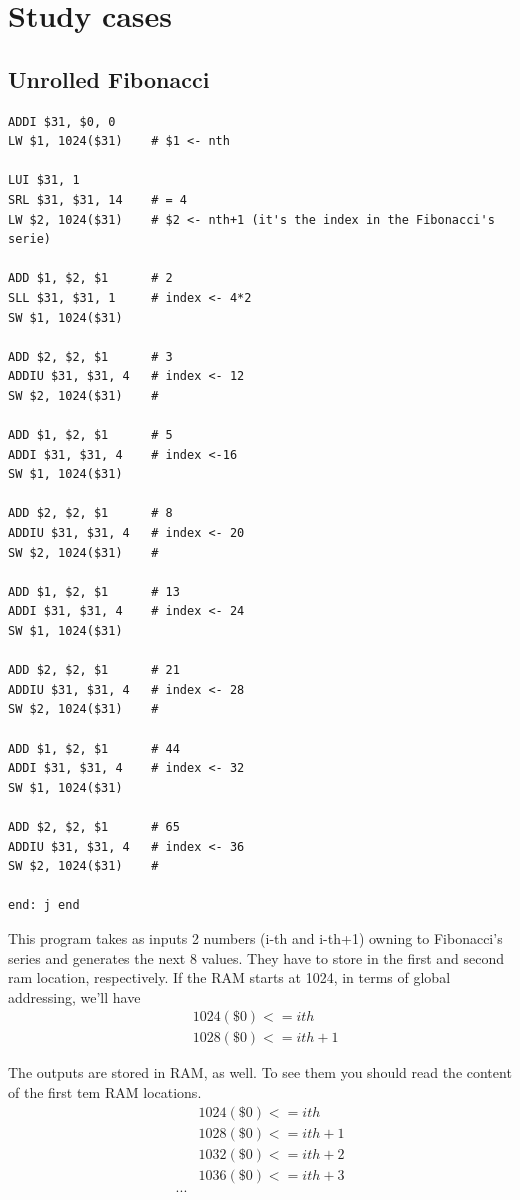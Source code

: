 \documentclass[a4paper,twoside]{article}
\theoremstyle{definition}
\theoremstyle{remark}
\begin{document}
\newpage


\section{Study cases}

\subsection{Unrolled Fibonacci}

\begin{lstlisting}
ADDI $31, $0, 0
LW $1, 1024($31)	# $1 <- nth

LUI $31, 1
SRL $31, $31, 14	# = 4
LW $2, 1024($31)	# $2 <- nth+1 (it's the index in the Fibonacci's serie)

ADD $1, $2, $1		# 2
SLL $31, $31, 1		# index <- 4*2
SW $1, 1024($31)

ADD $2, $2, $1		# 3
ADDIU $31, $31, 4	# index <- 12
SW $2, 1024($31)	# 

ADD $1, $2, $1		# 5
ADDI $31, $31, 4	# index <-16
SW $1, 1024($31)

ADD $2, $2, $1		# 8
ADDIU $31, $31, 4	# index <- 20
SW $2, 1024($31)	# 

ADD $1, $2, $1		# 13
ADDI $31, $31, 4	# index <- 24
SW $1, 1024($31)

ADD $2, $2, $1		# 21
ADDIU $31, $31, 4	# index <- 28
SW $2, 1024($31)	# 

ADD $1, $2, $1		# 44
ADDI $31, $31, 4	# index <- 32
SW $1, 1024($31)

ADD $2, $2, $1		# 65
ADDIU $31, $31, 4	# index <- 36
SW $2, 1024($31)	# 

end: j end
\end{lstlisting}

This program takes as inputs 2 numbers (i-th and i-th+1) owning to Fibonacci's 
series and generates the next 8 values. They have to store in the first and 
second ram location, respectively.
If the RAM starts at 1024, in terms of global addressing, we'll have
\begin{align*}
&1024(\$0) <= ith\\
&1028(\$0) <= ith+1
\end{align*}


The outputs are stored in RAM, as well. To see them you should read the content 
of the first tem RAM locations.
\begin{align*}
&1024(\$0) <= ith\\
&1028(\$0) <= ith+1\\
&1032(\$0) <= ith+2\\
&1036(\$0) <= ith+3\\
...
\end{align*}
\end{document}
